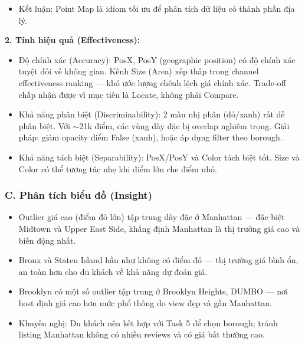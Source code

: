 \begin{itemize}
\begin{itemize}
        \item Ưu tiên 3 -- Kích thước điểm (Size / Area): Size mã hóa Price (Quantitative) theo diện tích điểm tròn --- điểm lớn hơn tương ứng với giá cao hơn. Theo Mackinlay, Area là kênh kém chính xác hơn cho dữ liệu định lượng so với Position hay Length (hệ số Stevens $n \approx 0.7$, Log\_error cao hơn), nhưng phù hợp với mục tiêu của biểu đồ này: task là locate, không phải so sánh chính xác giá trị. Thêm vào đó, outlier thường có giá cao nên đồng thời có Size lớn --- hiệu ứng kép giúp listing bất thường nổi bật gấp đôi so với phần còn lại ngay cả trong vùng dày đặc điểm như Manhattan.
    \end{itemize}
    \item Kết luận: Point Map là idiom tối ưu để phân tích dữ liệu có thành phần địa lý.
\end{itemize}

\textbf{2. Tính hiệu quả (Effectiveness):}

\begin{itemize}
    \item Độ chính xác (Accuracy): PosX, PosY (geographic position) có độ chính xác tuyệt đối về không gian. Kênh Size (Area) xếp thấp trong channel effectiveness ranking --- khó ước lượng chênh lệch giá chính xác. Trade-off chấp nhận được vì mục tiêu là Locate, không phải Compare.
    \item Khả năng phân biệt (Discriminability): 2 màu nhị phân (đỏ/xanh) rất dễ phân biệt. Với $\sim$21k điểm, các vùng dày đặc bị overlap nghiêm trọng. Giải pháp: giảm opacity điểm False (xanh), hoặc áp dụng filter theo borough.
    \item Khả năng tách biệt (Separability): PosX/PosY và Color tách biệt tốt. Size và Color có thể tương tác nhẹ khi điểm lớn che điểm nhỏ.
\end{itemize}

\subsubsection*{C. Phân tích biểu đồ (Insight)}

\begin{itemize}
    \item Outlier giá cao (điểm đỏ lớn) tập trung dày đặc ở Manhattan --- đặc biệt Midtown và Upper East Side, khẳng định Manhattan là thị trường giá cao và biến động nhất.
    \item Bronx và Staten Island hầu như không có điểm đỏ --- thị trường giá bình ổn, an toàn hơn cho du khách về khả năng dự đoán giá.
    \item Brooklyn có một số outlier tập trung ở Brooklyn Heights, DUMBO --- nơi host định giá cao hơn mức phổ thông do view đẹp và gần Manhattan.
    \item Khuyến nghị: Du khách nên kết hợp với Task 5 để chọn borough; tránh listing Manhattan không có nhiều reviews và có giá bất thường cao.
\end{itemize}

